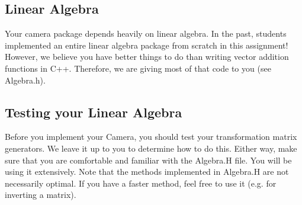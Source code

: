\documentclass[10pt,twocolumn]{article}
\begin{document}
\subsection{Linear Algebra}
Your camera package depends heavily on linear algebra. In the past, students implemented an entire linear algebra package from scratch in this assignment! However, we believe you have better things to do than writing vector addition functions in C++. Therefore, we are giving most of that code to you (see Algebra.h). %


\subsection{Testing your Linear Algebra}
Before you implement your Camera, you should test your transformation matrix generators. We leave it up to you to determine how to do this. Either way, make sure that you are comfortable and familiar with the Algebra.H file. You will be using it extensively. Note that the methods implemented in Algebra.H are not necessarily optimal. If you have a faster method, feel free to use it (e.g. for inverting a matrix).
\end{document}
